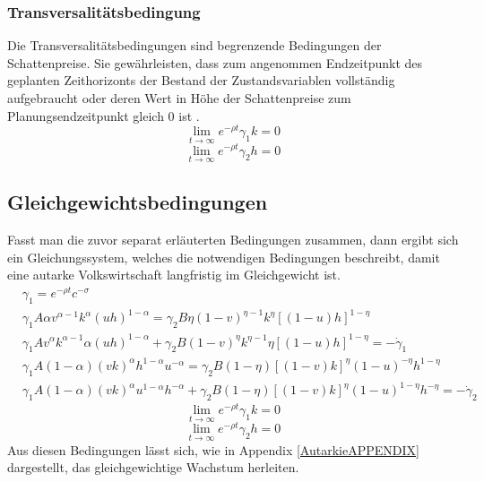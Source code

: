 \subsubsection*{Transversalitätsbedingung}
Die Transversalitätsbedingungen sind begrenzende Bedingungen der Schattenpreise. Sie gewährleisten, dass zum angenommen Endzeitpunkt des geplanten Zeithorizonts der Bestand der Zustandsvariablen vollständig aufgebraucht oder deren Wert in Höhe der Schattenpreise zum Planungsendzeitpunkt gleich $0$ ist \cite{Chiang.2000}.
%
\begin{equation}
	\lim_{t \to \infty}e^{-\rho t}\gamma_1k=0
\end{equation}
%
\vspace{-0.7cm}
%
\begin{equation}
	\lim_{t \to \infty}e^{-\rho t}\gamma_2h=0
\end{equation}
%
\subsection*{Gleichgewichtsbedingungen}
Fasst man die zuvor separat erläuterten Bedingungen zusammen, dann ergibt sich ein Gleichungssystem, welches die notwendigen Bedingungen beschreibt, damit eine autarke Volkswirtschaft langfristig im Gleichgewicht ist. 
%
\begin{align}
	&\gamma_1=e^{-\rho t}c^{-\sigma}\\
	&\gamma_1A\alpha v^{\alpha-1}k^\alpha(uh)^{1-\alpha}=\gamma_2B\eta(1-v)^{\eta-1}k^\eta[(1-u)h]^{1-\eta}\\
	&\gamma_{1}A v^{\alpha}k^{\alpha -1} \alpha(u h)^{1- \alpha} + \gamma_{2}B(1- v)^{\eta} k^{\eta -1} \eta \left [ (1-u)h \right ]^{1- \eta}= - \dot{\gamma}_{1}\label{foc3IL}\\
	&\gamma_1A(1-\alpha)(vk)^{\alpha}h^{1-\alpha}u^{-\alpha}=\gamma_2B(1-\eta)[(1-v)k]^\eta (1-u)^{-\eta} h^{1-\eta}\\
	&\gamma_1A(1-\alpha)(vk)^\alpha u^{1-\alpha}h^{-\alpha}+\gamma_2 B(1-\eta)[(1-v)k]^{\eta}(1-u)^{1-\eta}h^{-\eta}=-\dot{\gamma}_2
\end{align}
%
\vspace{-0.7cm}
%
\begin{equation}
	\lim_{t \to \infty}e^{-\rho t}\gamma_1k=0
\end{equation}
%
\vspace{-0.7cm}
%
\begin{equation}
	\lim_{t \to \infty}e^{-\rho t}\gamma_2h=0
\end{equation}
%
Aus diesen Bedingungen lässt sich, wie in Appendix \ref{AutarkieAPPENDIX} dargestellt, das gleichgewichtige Wachstum herleiten. 
%
